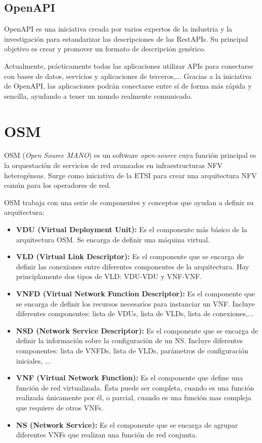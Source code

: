 \subsection{OpenAPI}
\label{subsec:openapi}

OpenAPI es una iniciativa creada por varios expertos de la industria y la investigación para estandarizar las descripciones de las RestAPIs. Su principal objetivo es crear y promover un formato de descripción genérico.

Actualmente, prácticamente todas las aplicaciones utilizar APIs para conectarse con bases de datos, servicios y aplicaciones de terceros,... Gracias a la iniciativa de OpenAPI, las aplicaciones podrán conectarse entre sí de forma más rápida y sencilla, ayudando a tener un mundo realmente comunicado.

\section{OSM}
\label{sec:osm}

OSM (\textit{Open Source MANO}) es un software \textit{open-source} cuya función principal es la orquestación de servicios de red avanzados en infraestructuras NFV heterogéneas. Surge como iniciativa de la ETSI para crear una arquitectura NFV común para los operadores de red.

OSM trabaja con una serie de componentes y conceptos que ayudan a definir su arquitectura:

\begin{itemize}
	\item \textbf{VDU (Virtual Deployment Unit):} Es el componente más básico de la arquitectura OSM. Se encarga de definir una máquina virtual. 
	
	\item \textbf{VLD (Virtual Link Descriptor):} Es el componente que se encarga de definir las conexiones entre diferentes componentes de la arquitectura. Hay principlamente dos tipos de VLD: VDU-VDU y VNF-VNF.
	
	\item \textbf{VNFD (Virtual Network Function Descriptor):} Es el componente que se encarga de definir los recursos necesarios para instanciar un VNF. Incluye diferentes componentes: lista de VDUs, lista de VLDs, lista de conexiones,...
	
	\item \textbf{NSD (Network Service Descriptor):} Es el componente que se encarga de definir la información sobre la configuración de un NS. Incluye diferentes componentes: lista de VNFDs, lista de VLDs, parámetros de configuración iniciales, ...
	
	\item \textbf{VNF (Virtual Network Function):} Es el componente que define una función de red virtualizada. Ésta puede ser completa, cuando es una función realizada únicamente por él, o parcial, cuando es una función mas compleja que requiere de otros VNFs.
	
	\item \textbf{NS (Network Service):} Es el componente que se encarga de agrupar diferentes VNFs que realizan una función de red conjunta.
\end{itemize}

